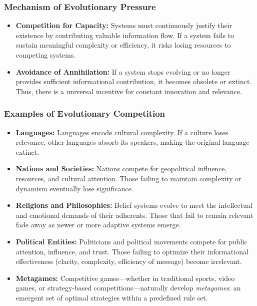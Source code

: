 \documentclass[12pt]{article}
\begin{document}
\subsubsection{Mechanism of Evolutionary Pressure}
\begin{itemize}
    \item \textbf{Competition for Capacity:}  
    Systems must continuously justify their existence by contributing valuable information flow. If a system fails to sustain meaningful complexity or efficiency, it risks losing resources to competing systems.
    
    \item \textbf{Avoidance of Annihilation:}  
    If a system stops evolving or no longer provides sufficient informational contribution, it becomes obsolete or extinct. Thus, there is a universal incentive for constant innovation and relevance.
\end{itemize}

\subsubsection{Examples of Evolutionary Competition}
\begin{itemize}
    \item \textbf{Languages:}  
    Languages encode cultural complexity. If a culture loses relevance, other languages absorb its speakers, making the original language extinct.
    \item \textbf{Nations and Societies:}
    Nations compete for geopolitical influence, resources, and cultural attention. Those failing to maintain complexity or dynamism eventually lose significance.
    \item \textbf{Religions and Philosophies:}  
    Belief systems evolve to meet the intellectual and emotional demands of their adherents. Those that fail to remain relevant fade away as newer or more adaptive systems emerge.
    \item \textbf{Political Entities:}  
    Politicians and political movements compete for public attention, influence, and trust. Those failing to optimize their informational effectiveness (clarity, complexity, efficiency of message) become irrelevant.
    \item \textbf{Metagames:}  
    Competitive games—whether in traditional sports, video games, or strategy-based competitions—naturally develop \textit{metagames}: an emergent set of optimal strategies within a predefined rule set. 
\end{itemize}
\end{document}

